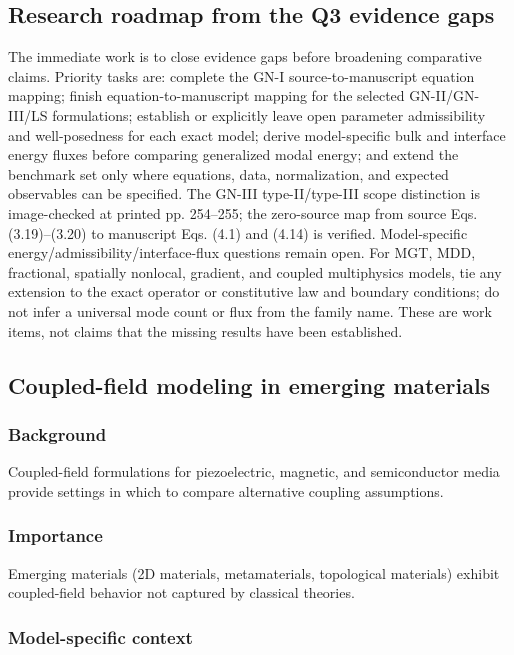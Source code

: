 \subsection{Research roadmap from the Q3 evidence gaps}
\label{sec:q3-roadmap}

The immediate work is to close evidence gaps before broadening comparative claims. Priority tasks are: complete the GN-I source-to-manuscript equation mapping; finish equation-to-manuscript mapping for the selected GN-II/GN-III/LS formulations; establish or explicitly leave open parameter admissibility and well-posedness for each exact model; derive model-specific bulk and interface energy fluxes before comparing generalized modal energy; and extend the benchmark set only where equations, data, normalization, and expected observables can be specified. The GN-III type-II/type-III scope distinction is image-checked at printed pp. 254–255; the zero-source map from source Eqs. (3.19)–(3.20) to manuscript Eqs. (4.1) and (4.14) is verified. Model-specific energy/admissibility/interface-flux questions remain open. For MGT, MDD, fractional, spatially nonlocal, gradient, and coupled multiphysics models, tie any extension to the exact operator or constitutive law and boundary conditions; do not infer a universal mode count or flux from the family name. These are work items, not claims that the missing results have been established.


\subsection{Coupled-field modeling in emerging materials}
\label{sec:coupled-field-modeling}

\subsubsection{Background}

Coupled-field formulations for piezoelectric, magnetic, and semiconductor media provide settings in which to compare alternative coupling assumptions.

\subsubsection{Importance}

Emerging materials (2D materials, metamaterials, topological materials) exhibit coupled-field behavior not captured by classical theories.

\subsubsection{Model-specific context}

